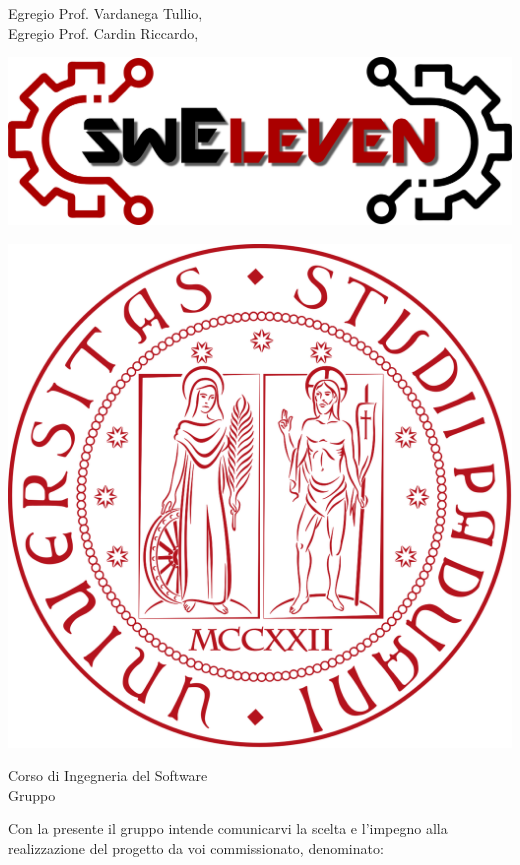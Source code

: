 \documentclass[a4paper, oneside, openany, dvipsnames, table,11pt]{letter}
\begin{document}
\pagestyle{empty}

    \begin{letter}
        { Egregio Prof. Vardanega Tullio,\\Egregio Prof. Cardin Riccardo,}
        \begin{minipage}{.5\textwidth}
            \begin{flushleft}
                \includegraphics[width=.6\linewidth]{../../Shared/logo.png}
            \end{flushleft}
        \end{minipage}
        \begin{minipage}{.4\textwidth}
            \begin{flushright}
                \includegraphics[width=.7\linewidth]{../../Shared/logo unipd.png}
            \end{flushright}
        \end{minipage}
        {    
        \begin{flushleft}
            Corso di Ingegneria del Software\\ Gruppo \Gruppo{}\\ 
        \end{flushleft}
        }
        \opening{ Con la presente il gruppo \Gruppo{} intende comunicarvi la scelta e l'impegno alla realizzazione del progetto da voi commissionato, denominato:}
        \begin{center}

\end{center}
\end{letter}
\end{document}
